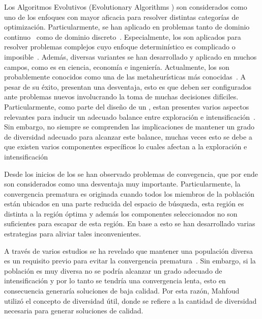 Los Algoritmos Evolutivos (Evolutionary Algorithms \EA{}) son considerados como uno de los enfoques con mayor aficacia para resolver distintas categorías de optimización.
%
Particularmente, se han aplicado en problemas tanto de dominio continuo~\cite{glover2005handbook} como de dominio discreto~\cite{Joel:Dynamic_FAP}.
%
Especialmente, los \EAS{} son aplicados para resolver problemas complejos cuyo enfoque determinístico es complicado o imposible~\cite{chakraborty2008advances}.
% 
Además, diversas variantes se han desarrollado y aplicado en muchos campos, como es en ciencia, economía e ingeniería.
%
%
Actualmente, los \EAS{} son probablemente conocidos como una de las metaheurísticas más conocidas~\cite{glover2005handbook}.
%
A pesar de su éxito, presentan una desventaja, esto es que deben ser configurados ante problemas nuevos involucrando la toma de muchas decisiones difíciles.
%
Particularmente, como parte del diseño de un \EA{}, estan presentes varios aspectos relevantes para inducir un adecuado balance entre exploración e intensificación~\cite{herrera1996adaptation}.
%
Sin embargo, no siempre se comprenden las implicaciones de mantener un grado de diversidad adecuado para alcanzar este balance, muchas veces esto se debe a que existen varios componentes específicos lo cuales afectan a la exploración e intensificación~\cite{Crepinsek:13}
%

Desde los inicios de los \EAS{} se han observado problemas de convegencia, que por ende son considerados como una desventaja muy importante\cite{Crepinsek:13}.
%
Particularmente, la convergencia prematura es originada cuando todos los miembros de la población están ubicados en una parte reducida del espacio de búsqueda, esta región es distinta a la región óptima y además los componentes seleccionados no son suficientes para escapar de esta región.
%
En base a esto se han desarrollado varias estrategias para aliviar tales inconvenientes.
%


A través de varios estudios se ha revelado que mantener una populación diversa es un requisito previo para evitar la convergencia prematura~\cite{Crepinsek:13}.
%
Sin embargo, si la población es muy diversa no se podría alcanzar un grado adecuado de intensificación y por lo tanto se tendría una convergencia lenta, esto en consecuencia generaría soluciones de baja calidad.
%
Por esta razón, Mahfoud~\cite{dasgupta2013evolutionary} utilizó el concepto de diversidad útil, donde se refiere a la cantidad de diversidad necesaria para generar soluciones de calidad.
%

